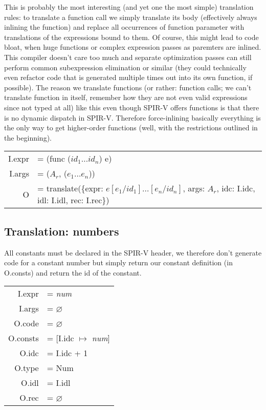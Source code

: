 \documentclass[letterpaper,12pt]{article}
\begin{document}
This is probably the most interesting (and yet one the most simple) translation
rules: to translate a function call we simply translate its body
(effectively always inlining the function) and replace all occurrences of 
function parameter with translations of the expressions bound to them.
Of course, this might lead to code bloat, when huge functions or complex expression passes
as paremters are inlined. This compiler doesn't care too much and
separate optimization passes can still perform common subexpression
elimination or similar (they could technically even refactor code that
is generated multiple times out into its own function, if possible).
The reason we translate functions (or rather: function calls; we can't translate
function in itself, remember how they are not even valid expressions since
not typed at all) like this even though SPIR-V offers functions is that
there is no dynamic dispatch in SPIR-V. Therefore force-inlining basically
everything is the only way to get higher-order functions (well, with
the restrictions outlined in the beginning).

\medskip
\begin{tabularx}{\linewidth}{rl}
	I.expr &= (func ($id_1 \dots id_n$) e) \\
	I.args &= ($A_r$, ($e_1 \dots e_n$)) \\
	O &= translate(\{expr: $e[e_1 / id_1]\dots[e_n / id_n]$, args: $A_r$, idc: I.idc, idl: I.idl, rec: I.rec\}) \\
\end{tabularx}

\subsection{Translation: numbers}

All constants must be declared in the SPIR-V header, we therefore
don't generate code for a constant number but simply return our
constant definition (in O.consts) and return the id of the constant.

\begin{tabularx}{\linewidth}{rl}
	I.expr &= \textit{num} \\
	I.args &= $\varnothing$ \\
	O.code &= $\varnothing$ \\
	O.consts &= [I.idc $\mapsto$ \textit{num}] \\
	O.idc &= I.idc + 1 \\
	O.type &= Num \\
	O.idl &= I.idl \\
	O.rec &= $\varnothing$ \\
\end{tabularx}
\end{document}
